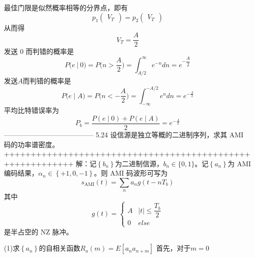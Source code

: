 \documentclass[utf8]{article}
\begin{document}
最佳门限是似然概率相等的分界点，即有
$$p_1\begin{pmatrix}V_T\end{pmatrix}=p_2\begin{pmatrix}V_T\end{pmatrix}$$
从而得
$$V_T=\frac{A}{2}$$
发送 0 而判错的概率是
$$P\big(e\:|\:0\big)=P\bigg(n>\dfrac{A}{2}\bigg)=\int_{A/2}^{\infty}e^{-n}dn=e^{-\dfrac{A}{2}}$$
发送$A$而判错的概率是
$$P\big(e\mid A\big)=P\bigg(n<-\frac{A}{2}\bigg)=\int_{-\infty}^{-A/2}e^ndn=e^{-\frac{A}{2}}$$
平均比特错误率为
$$P_b=\frac{P\left(e\mid0\right)+P\left(e\mid A\right)}{2}=e^{-\frac{A}{2}}$$
---------------------------------------
5.24 设信源是独立等概的二进制序列，求其 AMI 码的功率谱密度。
+++++++++++++++++++++++++++++++++++++++++++++++++++++++++++
解：记$\left\{b_n\right\}$为二进制信源，$b_n\in\{0,1\}$。记$\left\{a_n\right\}$为 AMI 编码结果，$\alpha_n\in\left\{+1,0,-1\right\}$。则 AMI
码波形可写为
$$s_\text{AMI}\left(t\right)=\sum_na_ng\left(t-nT_b\right)$$
其中
$$g\left(t\right)=\begin{cases}A&\left|t\right|\leq\dfrac{T_b}{2}\\0&\textit{else}\end{cases}$$
是半占空的 NZ 脉冲。

(1)求$\left\{a_n\right\}$的自相关函数$R_a\left(m\right)=E\left[a_na_{n+m}\right]$
首先，对于$m=0$
\end{document}
